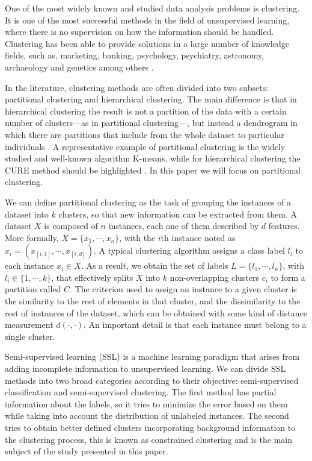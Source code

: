 \documentclass[review]{elsarticle}
\begin{document}
One of the most widely known and studied data analysis problems is clustering. It is one of the most successful methods in the field of unsupervised learning, where there is no supervision on how the information should be handled. Clustering has been able to provide solutions in a large number of knowledge fields, such as, marketing, banking, psychology, psychiatry, astronomy, archaeology and genetics among others \cite{Everitt:2009:CA:1538772}.

In the literature, clustering methods are often divided into two subsets: partitional clustering and hierarchical clustering. The main difference is that in hierarchical clustering the result is not a partition of the data with a certain number of clusters---as in partitional clustering---, but instead a dendrogram in which there are partitions that include from the whole dataset to particular individuals \cite{Everitt:2009:CA:1538772}. A representative example of partitional clustering is the widely studied and well-known algorithm K-means, while for hierarchical clustering the CURE method should be highlighted \cite{wu2009top, guha1998cure}. In this paper we will focus on partitional clustering.

We can define partitional clustering as the task of grouping the instances of a dataset into $k$ clusters, so that new information can be extracted from them. A dataset $X$ is composed of $n$ instances, each one of them described by $d$ features. More formally, $X = \{x_1, \cdots, x_n\}$, with the $i$th instance noted as $x_i = (x_{[i,1]}, \cdots, x_{[i,d]})$. A typical clustering algorithm assigns a class label $l_i$ to each instance $x_i \in X$. As a result, we obtain the set of labels $L = \{l_1, \cdots, l_n\}$, with $l_i \in \{1, \cdots, k\}$, that effectively splits $X$ into $k$ non-overlapping clusters $c_i$ to form a partition called $C$. The criterion used to assign an instance to a given cluster is the similarity to the rest of elements in that cluster, and the dissimilarity to the rest of instances of the dataset, which can be obtained with some kind of distance measurement $d(\cdot, \cdot)$. An important detail is that each instance must belong to a single cluster. \cite{jain1999data}

Semi-supervised learning (SSL) is a machine learning paradigm that arises from adding incomplete information to unsupervised learning. We can divide SSL methods into two broad categories according to their objective: semi-supervised classification and semi-supervised clustering. The first method has partial information about the labels, so it tries to minimize the error based on them while taking into account the distribution of unlabeled instances. The second tries to obtain better defined clusters incorporating background information to the clustering process, this is known as constrained clustering and is the main subject of the study presented in this paper. \cite{triguero2015self}
\end{document}
